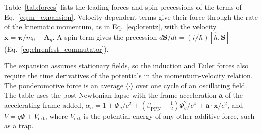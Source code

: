 \documentclass[aps,prd,onecolumn,tightenlines,nofootinbib,notitlepage,11pt,floatfix]{revtex4-2}
\theoremstyle{indentedtheorem}
\begin{document}
Table~\ref{tab:forces} lists the leading forces and spin precessions of the terms of Eq.~\eqref{eq:nr_expansion}. Velocity-dependent terms give their force through the rate of the kinematic momentum, as in Eq.~\eqref{eq:lorentz}, with the velocity $\dot{\mathbf{x}}=\boldsymbol{\pi}/m_0-\mathbf{A}_g$. A spin term gives the precession $d\mathbf{S}/dt=(i/\hbar)[\hat{h},\mathbf{S}]$ (Eq.~\eqref{eq:ehrenfest_commutator}).

The expansion assumes stationary fields, so the induction and Euler forces also require the time derivatives of the potentials in the momentum-velocity relation. The ponderomotive force is an average $\langle\cdot\rangle$ over one cycle of an oscillating field. The table uses the post-Newtonian lapse with the frame acceleration $\mathbf{a}$ of the accelerating frame added, $\alpha_n=1+\Phi_g/c^2+(\beta_\text{PPN}-\tfrac{1}{2})\Phi_g^2/c^4+\mathbf{a}\cdot\mathbf{x}/c^2$, and $V=q\Phi+V_\text{ext}$, where $V_\text{ext}$ is the potential energy of any other additive force, such as a trap.
\end{document}
